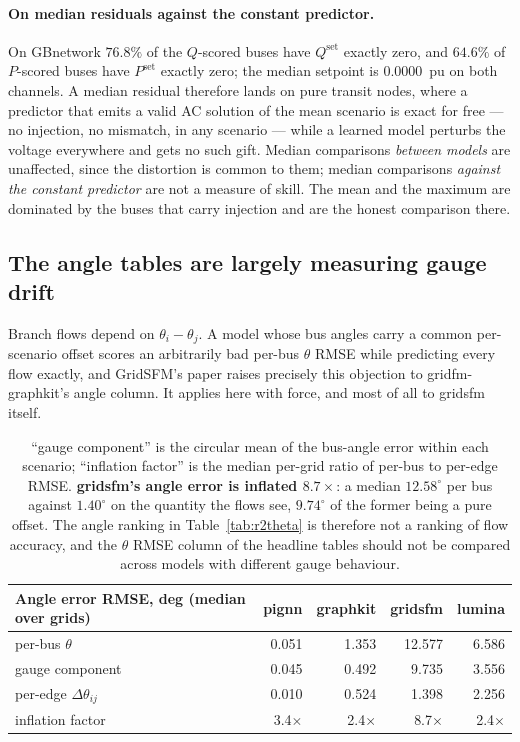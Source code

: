 \documentclass[10pt]{article}
\begin{document}
\paragraph{On median residuals against the constant predictor.} On GBnetwork
$76.8\%$ of the $Q$-scored buses have $Q^{\mathrm{set}}$ exactly zero, and
$64.6\%$ of $P$-scored buses have $P^{\mathrm{set}}$ exactly zero; the median
setpoint is $0.0000$~pu on both channels. A median residual therefore lands on
pure transit nodes, where a predictor that emits a valid AC solution of the
mean scenario is exact for free --- no injection, no mismatch, in any scenario
--- while a learned model perturbs the voltage everywhere and gets no such
gift. Median comparisons \emph{between models} are unaffected, since the
distortion is common to them; median comparisons \emph{against the constant
predictor} are not a measure of skill. The mean and the maximum are dominated
by the buses that carry injection and are the honest comparison there.

\subsection*{The angle tables are largely measuring gauge drift}

Branch flows depend on $\theta_i-\theta_j$.  A model whose bus angles carry a
common per-scenario offset scores an arbitrarily bad per-bus $\theta$ RMSE
while predicting every flow exactly, and GridSFM's paper raises precisely this
objection to gridfm-graphkit's angle column.  It applies here with force, and
most of all to gridsfm itself.

\begin{table}[H]
\centering\small
\begin{tabular}{lrrrr}
\toprule
Angle error RMSE, deg (median over grids) & pignn & graphkit & gridsfm & lumina\\
\midrule
per-bus $\theta$ & 0.051 & 1.353 & 12.577 & 6.586 \\
gauge component & 0.045 & 0.492 & 9.735 & 3.556 \\
per-edge $\Delta\theta_{ij}$ & 0.010 & 0.524 & 1.398 & 2.256 \\
inflation factor & 3.4$\times$ & 2.4$\times$ & 8.7$\times$ & 2.4$\times$ \\
\bottomrule
\end{tabular}
\caption{``gauge component'' is the circular mean of the bus-angle error within
each scenario; ``inflation factor'' is the median per-grid ratio of per-bus to
per-edge RMSE.  \textbf{gridsfm's angle error is inflated $8.7\times$}: a
median $12.58^\circ$ per bus against $1.40^\circ$ on the quantity the flows
see, $9.74^\circ$ of the former being a pure offset.  The angle ranking in
Table~\ref{tab:r2theta} is therefore not a ranking of flow accuracy, and the
$\theta$ RMSE column of the headline tables should not be compared across
models with different gauge behaviour.}
\end{table}
\end{document}
